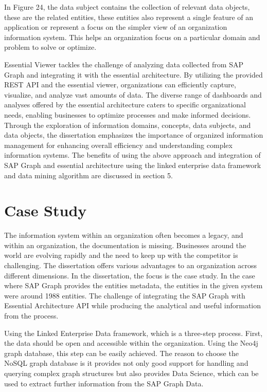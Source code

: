 \documentclass{article}
\begin{document}
In Figure 24, the data subject contains the collection of relevant data objects, these are the related entities, these entities also represent a single feature of an application or represent a focus on the simpler view of an organization information system. This helps an organization focus on a particular domain and problem to solve or optimize.

Essential Viewer tackles the challenge of analyzing data collected from SAP Graph and integrating it with the essential architecture. By utilizing the provided REST API and the essential viewer, organizations can efficiently capture, visualize, and analyze vast amounts of data. The diverse range of dashboards and analyses offered by the essential architecture caters to specific organizational needs, enabling businesses to optimize processes and make informed decisions. Through the exploration of information domains, concepts, data subjects, and data objects, the dissertation emphasizes the importance of organized information management for enhancing overall efficiency and understanding complex information systems. The benefits of using the above approach and integration of SAP Graph and essential architecture using the linked enterprise data framework and data mining algorithm are discussed in section 5.


\maketitle
\section{Case Study}
The information system within an organization often becomes a legacy, and within an organization, the documentation is missing. Businesses around the world are evolving rapidly and the need to keep up with the competitor is challenging. The dissertation offers various advantages to an organization across different dimensions. In the dissertation, the focus is the case study. In the case where SAP Graph provides the entities metadata, the entities in the given system were around 1988 entities. The challenge of integrating the SAP Graph with Essential Architecture API while producing the analytical and useful information from the process.

Using the Linked Enterprise Data framework, which is a three-step process. First, the data should be open and accessible within the organization. Using the Neo4j graph database, this step can be easily achieved. The reason to choose the NoSQL graph database is it provides not only good support for handling and querying complex graph structures but also provides Data Science, which can be used to extract further information from the SAP Graph Data.
\end{document}
